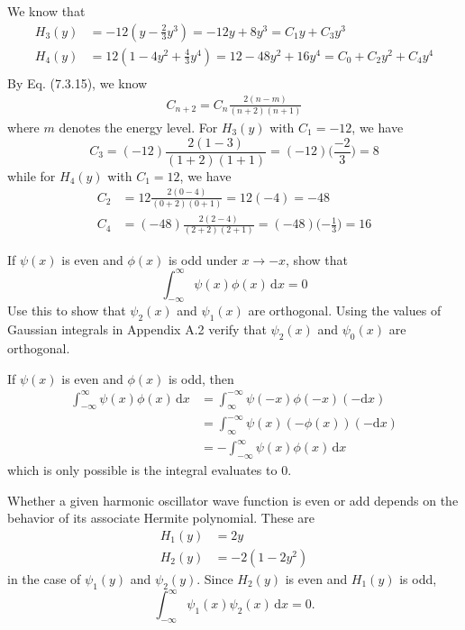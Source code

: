 \documentclass[../principles-of-quantum-mechanics.tex]{subfiles}
\begin{document}
\begin{questions}
		\begin{solution}
			We know that
			\begin{align*}
				H_3(y) &= -12(y - \tfrac{2}{3}y^3) = -12y + 8y^3 = C_1y + C_3y^3 \\
				H_4(y) &= 12(1 - 4y^2 + \tfrac{4}{3}y^4) = 12 - 48y^2 + 16y^4 = C_0 + C_2y^2 + C_4y^4 \\
			\end{align*}
			By Eq. (7.3.15), we know
			\begin{align*}
				C_{n + 2} = C_n\frac{2(n - m)}{(n + 2)(n + 1)}
			\end{align*}
			where $m$ denotes the energy level. For $H_3(y)$ with $C_1 = -12$, we have
			$$C_3 = (-12)\frac{2(1 - 3)}{(1 + 2)(1 + 1)} = (-12)\Big(\frac{-2}{3}\Big) = 8$$
			while for $H_4(y)$ with $C_1 = 12$, we have
			\begin{align*}
				C_2 &= 12\frac{2(0 - 4)}{(0 + 2)(0 + 1)} = 12(-4) = -48 \\
				C_4 &= (-48)\frac{2(2 - 4)}{(2 + 2)(2 + 1)} = (-48)\Big({-\frac{1}{3}}\Big) = 16
			\end{align*}
		\end{solution}
		
		\question If $\psi(x)$ is even and $\phi(x)$ is odd under $x\to {-x}$, show that
		$$\int_{-\infty}^{\infty}\psi(x)\phi(x)\,\mathrm{d}x = 0$$
		Use this to show that $\psi_2(x)$ and $\psi_1(x)$ are orthogonal. Using the values of Gaussian integrals in Appendix A.2 verify that $\psi_2(x)$ and $\psi_0(x)$ are orthogonal.
		
		\begin{solution}
			If $\psi(x)$ is even and $\phi(x)$ is odd, then
			\begin{align*}
				\int_{-\infty}^{\infty}\psi(x)\phi(x)\,\mathrm{d}x &= \int_{\infty}^{-\infty}\psi(-x)\phi(-x)(-\mathrm{d}x) \\
				&= \int_{\infty}^{-\infty}\psi(x)(-\phi(x))(-\mathrm{d}x) \\
				&= -\int_{-\infty}^{\infty}\psi(x)\phi(x)\,\mathrm{d}x
			\end{align*}
			which is only possible is the integral evaluates to $0$.
			
			Whether a given harmonic oscillator wave function is even or add depends on the behavior of its associate Hermite polynomial. These are
			\begin{align*}
				H_1(y) &= 2y \\
				H_2(y) &= -2(1 - 2y^2)
			\end{align*}
			in the case of $\psi_1(y)$ and $\psi_2(y)$. Since $H_2(y)$ is even and $H_1(y)$ is odd,
			$$\int_{-\infty}^{\infty}\psi_1(x)\psi_2(x)\,\mathrm{d}x = 0.$$
			

\end{solution}
\end{questions}
\end{document}
